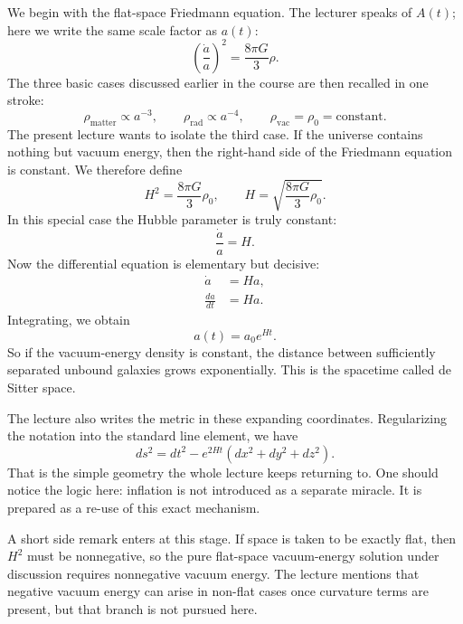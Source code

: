We begin with the flat-space Friedmann equation. The lecturer speaks of \(A(t)\); here we write the same scale factor as \(a(t)\):
\begin{equation}
\left(\frac{\dot a}{a}\right)^2=\frac{8\pi G}{3}\rho .
\end{equation}
The three basic cases discussed earlier in the course are then recalled in one stroke:
\begin{equation}
\rho_{\mathrm{matter}}\propto a^{-3},\qquad
\rho_{\mathrm{rad}}\propto a^{-4},\qquad
\rho_{\mathrm{vac}}=\rho_0=\text{constant}.
\end{equation}
The present lecture wants to isolate the third case. If the universe contains nothing but vacuum energy, then the right-hand side of the Friedmann equation is constant. We therefore define
\begin{equation}
H^2=\frac{8\pi G}{3}\rho_0,
\qquad
H=\sqrt{\frac{8\pi G}{3}\rho_0}.
\end{equation}
In this special case the Hubble parameter is truly constant:
\begin{equation}
\frac{\dot a}{a}=H.
\end{equation}
Now the differential equation is elementary but decisive:
\begin{align}
\dot a &= Ha,\\
\frac{da}{dt} &= Ha.
\end{align}
Integrating, we obtain
\begin{equation}
a(t)=a_0 e^{Ht}.
\end{equation}
So if the vacuum-energy density is constant, the distance between sufficiently separated unbound galaxies grows exponentially. This is the spacetime called de Sitter space.

The lecture also writes the metric in these expanding coordinates. Regularizing the notation into the standard line element, we have
\begin{equation}
ds^2 = dt^2 - e^{2Ht}\left(dx^2+dy^2+dz^2\right).
\end{equation}
That is the simple geometry the whole lecture keeps returning to. One should notice the logic here: inflation is not introduced as a separate miracle. It is prepared as a re-use of this exact mechanism.

A short side remark enters at this stage. If space is taken to be exactly flat, then \(H^2\) must be nonnegative, so the pure flat-space vacuum-energy solution under discussion requires nonnegative vacuum energy. The lecture mentions that negative vacuum energy can arise in non-flat cases once curvature terms are present, but that branch is not pursued here.

